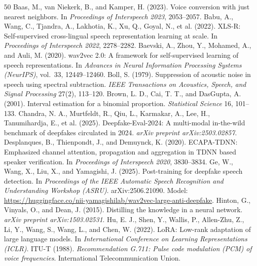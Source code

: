 \documentclass[10pt,a4paper,twocolumn]{article}
\begin{document}
\begin{thebibliography}{50}
\setlength{\itemsep}{2pt}
 Baas, M., van Niekerk, B., and Kamper, H. (2023). Voice conversion with just nearest neighbors. In \emph{Proceedings of Interspeech 2023}, 2053--2057.
 Babu, A., Wang, C., Tjandra, A., Lakhotia, K., Xu, Q., Goyal, N., et al. (2022). XLS-R: Self-supervised cross-lingual speech representation learning at scale. In \emph{Proceedings of Interspeech 2022}, 2278--2282.
 Baevski, A., Zhou, Y., Mohamed, A., and Auli, M. (2020). wav2vec 2.0: A framework for self-supervised learning of speech representations. In \emph{Advances in Neural Information Processing Systems (NeurIPS)}, vol.~33, 12449--12460.
 Boll, S. (1979). Suppression of acoustic noise in speech using spectral subtraction. \emph{IEEE Transactions on Acoustics, Speech, and Signal Processing} 27(2), 113--120.
 Brown, L. D., Cai, T. T., and DasGupta, A. (2001). Interval estimation for a binomial proportion. \emph{Statistical Science} 16, 101--133.
 Chandra, N. A., Murtfeldt, R., Qiu, L., Karmakar, A., Lee, H., Tanumihardja, E., et al. (2025). Deepfake-Eval-2024: A multi-modal in-the-wild benchmark of deepfakes circulated in 2024. \emph{arXiv preprint arXiv:2503.02857}.
 Desplanques, B., Thienpondt, J., and Demuynck, K. (2020). ECAPA-TDNN: Emphasized channel attention, propagation and aggregation in TDNN based speaker verification. In \emph{Proceedings of Interspeech 2020}, 3830--3834.
 Ge, W., Wang, X., Liu, X., and Yamagishi, J. (2025). Post-training for deepfake speech detection. In \emph{Proceedings of the IEEE Automatic Speech Recognition and Understanding Workshop (ASRU)}. arXiv:2506.21090. Model: \url{https://huggingface.co/nii-yamagishilab/wav2vec-large-anti-deepfake}.
 Hinton, G., Vinyals, O., and Dean, J. (2015). Distilling the knowledge in a neural network. \emph{arXiv preprint arXiv:1503.02531}.
 Hu, E. J., Shen, Y., Wallis, P., Allen-Zhu, Z., Li, Y., Wang, S., Wang, L., and Chen, W. (2022). LoRA: Low-rank adaptation of large language models. In \emph{International Conference on Learning Representations (ICLR)}.
 ITU-T (1988). \emph{Recommendation G.711: Pulse code modulation (PCM) of voice frequencies}. International Telecommunication Union.

\end{thebibliography}
\end{document}
